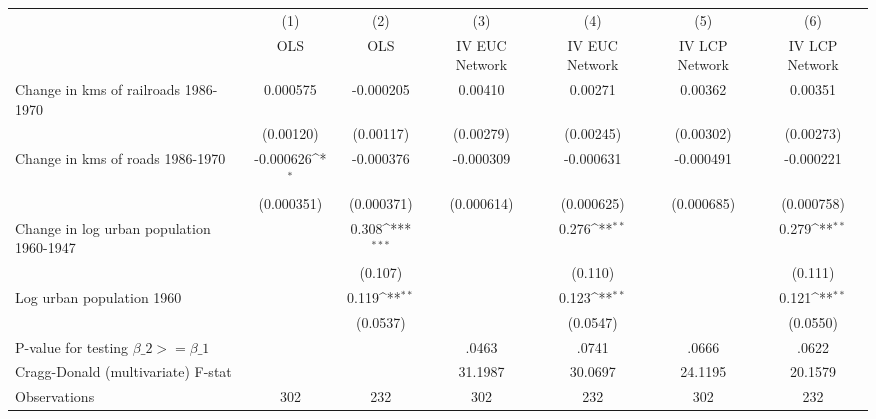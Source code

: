 {
\def\sym#1{\ifmmode^{#1}\else\(^{#1}\)\fi}
\begin{tabular}{l*{6}{c}}
\hline\hline
                &\multicolumn{1}{c}{(1)}&\multicolumn{1}{c}{(2)}&\multicolumn{1}{c}{(3)}&\multicolumn{1}{c}{(4)}&\multicolumn{1}{c}{(5)}&\multicolumn{1}{c}{(6)}\\
                &\multicolumn{1}{c}{OLS}&\multicolumn{1}{c}{OLS}&\multicolumn{1}{c}{IV EUC Network}&\multicolumn{1}{c}{IV EUC Network}&\multicolumn{1}{c}{IV LCP Network}&\multicolumn{1}{c}{IV LCP Network}\\
\hline
Change in kms of railroads 1986-1970& 0.000575         &-0.000205         &  0.00410         &  0.00271         &  0.00362         &  0.00351         \\
                &(0.00120)         &(0.00117)         &(0.00279)         &(0.00245)         &(0.00302)         &(0.00273)         \\
[1em]
Change in kms of roads 1986-1970&-0.000626\sym{*}  &-0.000376         &-0.000309         &-0.000631         &-0.000491         &-0.000221         \\
                &(0.000351)         &(0.000371)         &(0.000614)         &(0.000625)         &(0.000685)         &(0.000758)         \\
[1em]
Change in log urban population 1960-1947&                  &    0.308\sym{***}&                  &    0.276\sym{**} &                  &    0.279\sym{**} \\
                &                  &  (0.107)         &                  &  (0.110)         &                  &  (0.111)         \\
[1em]
Log urban population 1960&                  &    0.119\sym{**} &                  &    0.123\sym{**} &                  &    0.121\sym{**} \\
                &                  & (0.0537)         &                  & (0.0547)         &                  & (0.0550)         \\
\hline
P-value for testing $\beta\_{2} >= \beta\_{1}$&                  &                  &    .0463         &    .0741         &    .0666         &    .0622         \\
Cragg-Donald (multivariate) F-stat&                  &                  &  31.1987         &  30.0697         &  24.1195         &  20.1579         \\
Observations    &      302         &      232         &      302         &      232         &      302         &      232         \\
\hline\hline
\end{tabular}
}
